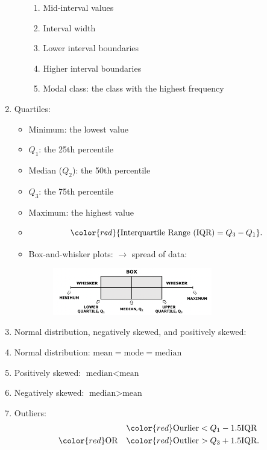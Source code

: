 \documentclass[12pt, a4paper]{article}
\begin{document}
\begin{enumerate}
\begin{itemize}
        \begin{enumerate}
            \item Mid-interval values
            \item Interval width
            \item Lower interval boundaries
            \item Higher interval boundaries
            \item Modal class: the class with the highest frequency
        \end{enumerate}
    \end{itemize}
    \item Quartiles: 
    \begin{itemize}
        \item Minimum: the lowest value
        \item $Q_1$: the 25th percentile
        \item Median ($Q_2$): the 50th percentile
        \item $Q_3$: the 75th percentile
        \item Maximum: the highest value
        \item $${\color{red}{\text{Interquartile Range (IQR)}=Q_3-Q_1}}.$$ 
        \item Box-and-whisker plots: $\rightarrow$ spread of data: 
        \begin{figure}[H]
            \center
            \includegraphics[width=0.7\textwidth]{Fig.4.4.jpg}
        \end{figure}
    \end{itemize}
    \item Normal distribution, negatively skewed, and positively skewed: 
    \item Normal distribution: $\text{mean}=\text{mode}=\text{median}$
    \item Positively skewed: $\text{median}<\text{mean}$
    \item Negatively skewed: $\text{median}>\text{mean}$
    \item Outliers: 
    $$\begin{aligned}
        &\color{red}\text{Ourlier}<Q_1-1.5\text{IQR}\\
    {\color{red}\text{OR}\quad}&{\color{red}\text{Outlier}>Q_3+1.5\text{IQR}}.

\end{aligned}$$
\end{enumerate}
\end{document}
